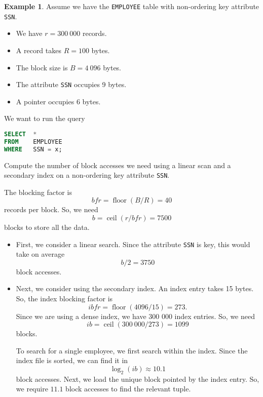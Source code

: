 \documentclass[a4paper, openany]{memoir}
\theoremstyle{definition}
\newtheorem{example}[subsection]{Example}
\begin{document}
\begin{example}
    Assume we have the \texttt{EMPLOYEE} table with non-ordering key attribute \texttt{SSN}. 
    \begin{itemize}
        \item We have $r = 300 \ 000$ records.
        \item A record takes $R = 100$ bytes.
        \item The block size is $B = 4 \ 096$ bytes.
        \item The attribute \texttt{SSN} occupies 9 bytes.
        \item A pointer occupies 6 bytes.
    \end{itemize}
    We want to run the query
\begin{lstlisting}[language=SQL]
SELECT  *
FROM    EMPLOYEE
WHERE   SSN = x;
\end{lstlisting}
    Compute the number of block accesses we need using a linear scan and a secondary index on a non-ordering key attribute \texttt{SSN}.
\end{example}
\begin{answer}
    The blocking factor is
    \[\textit{bfr} = \operatorname{floor}(B/R) = 40\]
    records per block. So, we need
    \[b = \operatorname{ceil}(r/\textit{bfr}) = 7500\]
    blocks to store all the data.
    \begin{itemize}
        \item First, we consider a linear search. Since the attribute \texttt{SSN} is key, this would take on average 
        \[b/2 = 3750\]
        block accesses.

        \item Next, we consider using the secondary index. An index entry takes 15 bytes. So, the index blocking factor is
        \[\textit{ibfr} = \operatorname{floor}(4096/15) = 273.\]
        Since we are using a dense index, we have 300 000 index entries. So, we need
        \[\textit{ib} = \operatorname{ceil}(300 \ 000/273) = 1099\]
        blocks. 
    
        To search for a single employee, we first search within the index. Since the index file is sorted, we can find it in
        \[\log_2(\textit{ib}) \approx 10.1\]
        block accesses. Next, we load the unique block pointed by the index entry. So, we require $11.1$ block accesses to find the relevant tuple.
    \end{itemize}
\end{answer}
\end{document}
